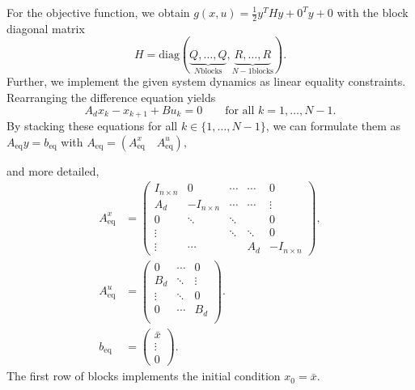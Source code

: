 \documentclass[]{article}
\newcommand{\ind}[2]{{#1}_{\mathrm{#2}}}
\newcommand{\trp}{^T}
\newcommand{\xnull}{x_0}
\newcommand{\xk}{x_k}
\newcommand{\uk}{u_k}
\newcommand{\Ad}{A_d}
\newcommand{\Bd}{B_d}
\newcommand{\xkplus}{x_{k+1}}
\newcommand{\Aeq}{\ind{A}{eq}}
\newcommand{\beq}{\ind{b}{eq}}
\newcommand{\Aeqx}{\Aeq^x}
\newcommand{\Aequ}{\Aeq^u}
\newcommand{\xbar}{\bar{x}}
\newcommand{\half}{\frac{1}{2}}
\begin{document}
\begin{enumerate}
	 For the objective function, we obtain $ g(x,u) = \half y\trp H y + 0 \trp y + 0 $ with
 the block diagonal matrix \[ H = \mathrm{diag} (\underbrace{Q,\dots,Q}_{N \text{blocks}},\underbrace{R,\dots,R}_{N-1 \text{blocks}}). \]
 Further, we implement the given system dynamics as linear equality constraints. Rearranging the difference equation yields \[ \Ad\xk - \xkplus + B\uk = 0 \qquad \text{for all } k = 1,\dots,N-1. \]
 By stacking these equations for all $ k \in \{1,\dots,N-1\} $, we can formulate them as
% 
  $ \Aeq y = \beq $ with
  $ \Aeq =   \left( \Aeqx \quad \Aequ \right), $
  
  
  and more detailed,
 \begin{align*}
 \Aeqx &=  \begin{pmatrix}
 I_{n\times n} & 0 & \cdots & \cdots & 0\\
 \Ad & -I_{n\times n} & \cdots & \cdots & \vdots\\
 0 & \ddots & \ddots &  &  0\\
 \vdots & & \ddots  & \ddots & 0\\
 \vdots & \cdots & & \Ad & -I_{n\times n}
 \end{pmatrix},\\
 \Aequ &= \begin{pmatrix}
 0 & \cdots & 0\\
 \Bd &\ddots &\vdots\\
 \vdots &\ddots & 0\\
 0 & \cdots & \Bd\\
 \end{pmatrix}.\\
 \beq &= \begin{pmatrix}
 \xbar\\\vdots\\0
 \end{pmatrix}.
 \end{align*}
The first row of blocks implements the initial condition $ \xnull = \xbar $.


\end{enumerate}
\end{document}
